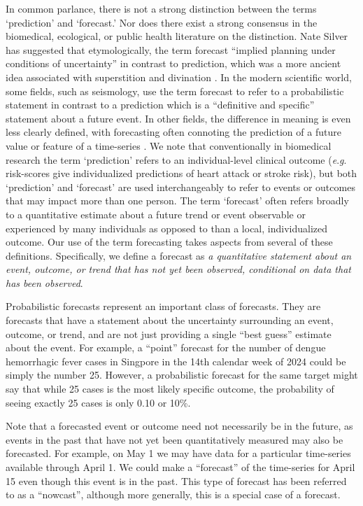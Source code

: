 \documentclass[a4paper]{article}
\newcommand{\eg}{\textit{e}.\textit{g}. }
\begin{document}
In common parlance, there is not a strong distinction between the terms `prediction' and `forecast.'
Nor does there exist a strong consensus in the biomedical, ecological, or public health literature on the distinction.
Nate Silver has suggested that etymologically, the term forecast ``implied planning under conditions of uncertainty'' in contrast to prediction, which was a more ancient idea associated with superstition and divination \cite{Silver2012}.
In the modern scientific world, some fields, such as seismology, use the term forecast to refer to a probabilistic statement in contrast to a prediction which is a ``definitive and specific'' statement about a future event.
In other fields, the difference in meaning is even less clearly defined, with forecasting often connoting the prediction of a future value or feature of a time-series \cite{Diebold2001}.
We note that conventionally in biomedical research the term `prediction' refers to an individual-level clinical outcome (\eg risk-scores give individualized predictions of heart attack or stroke risk), but both `prediction' and `forecast' are used interchangeably to refer to events or outcomes that may impact more than one person.
The term `forecast' often refers broadly to a quantitative estimate about a future trend or event observable or experienced by many individuals as opposed to than a local, individualized outcome. 
Our use of the term forecasting takes aspects from several of these definitions.
Specifically, we define a forecast as
{\em a quantitative statement about an event, outcome, or trend that has not yet been observed, conditional on data that has been observed}.

Probabilistic forecasts represent an important class of forecasts. They are forecasts that have a statement about the uncertainty surrounding an event, outcome, or trend, and are not just providing a single ``best guess'' estimate about the event. For example, a ``point'' forecast for the number of dengue hemorrhagic fever cases in Singpore in the 14th calendar week of 2024 could be simply the number 25. However, a probabilistic forecast for the same target might say that while 25 cases is the most likely specific outcome, the probability of seeing exactly 25 cases is only 0.10 or 10\%.

Note that a forecasted event or outcome need not necessarily be in the future, as events in the past that have not yet been quantitatively measured may also be forecasted.
For example, on May 1 we may have data for a particular time-series available through April 1.
We could make a ``forecast'' of the time-series for April 15 even though this event is in the past.
This type of forecast has been referred to as a ``nowcast'',\cite{brooks2018nonmechanistic,reich2019collaborative} although more generally, this is a special case of a forecast.
\end{document}
